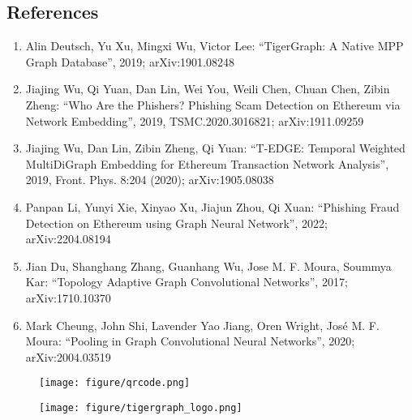 \documentclass[article,36pt,extrafontsizes,oneside,openany,oldfontcommands]{memoir}
\begin{document}
\begin{adjmulticols*}{3}{0.5in}{0.5in}
\section{References}
\begin{adjustwidth}{0.1in}{0in}
\begin{enumerate}[topsep=0pt,itemsep=0ex,partopsep=0ex,parsep=0ex]
\item Alin Deutsch, Yu Xu, Mingxi Wu, Victor Lee: “TigerGraph: A Native MPP Graph Database”, 2019; arXiv:1901.08248
\item Jiajing Wu, Qi Yuan, Dan Lin, Wei You, Weili Chen, Chuan Chen, Zibin Zheng: “Who Are the Phishers? Phishing Scam Detection on Ethereum via Network Embedding”, 2019, TSMC.2020.3016821; arXiv:1911.09259
\item Jiajing Wu, Dan Lin, Zibin Zheng, Qi Yuan: “T-EDGE: Temporal Weighted MultiDiGraph Embedding for Ethereum Transaction Network Analysis”, 2019, Front. Phys. 8:204 (2020); arXiv:1905.08038
\item Panpan Li, Yunyi Xie, Xinyao Xu, Jiajun Zhou, Qi Xuan: “Phishing Fraud Detection on Ethereum using Graph Neural Network”, 2022; arXiv:2204.08194
\item Jian Du, Shanghang Zhang, Guanhang Wu, Jose M. F. Moura, Soummya Kar: “Topology Adaptive Graph Convolutional Networks”, 2017; arXiv:1710.10370
\item Mark Cheung, John Shi, Lavender Yao Jiang, Oren Wright, José M. F. Moura: “Pooling in Graph Convolutional Neural Networks”, 2020; arXiv:2004.03519



\end{enumerate} 
\end{adjustwidth}

\linebreak

\begin{figure}
	\centering
	\begin{minipage}{0.45\linewidth}
		\centering
		\texttt{[image: figure/qrcode.png]}
	\end{minipage}\hfill
	\begin{minipage}{0.45\linewidth}
		\centering
		\texttt{[image: figure/tigergraph\_logo.png]}
	\end{minipage}\hfill
\end{figure}


\end{adjmulticols*}
\end{document}

